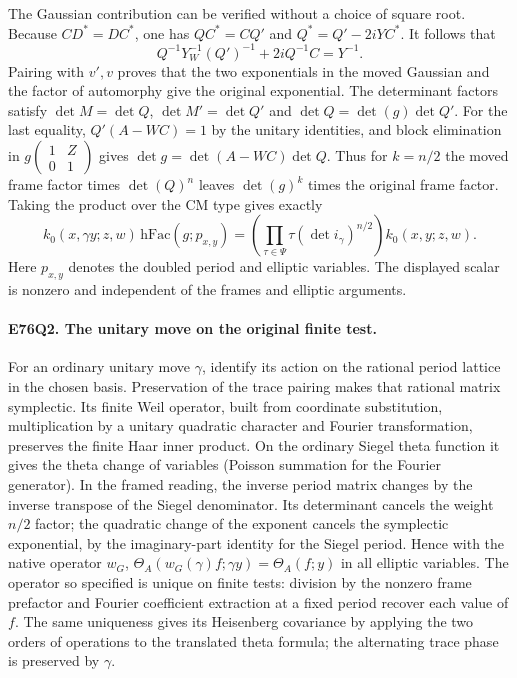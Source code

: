 The Gaussian contribution can be verified without a choice of
square root. Because $CD^*=DC^*$, one has $QC^*=CQ'$ and
$Q^*=Q'-2iYC^*$. It follows that
\[
 Q^{-1}Y_W^{-1}(Q')^{-1}+2iQ^{-1}C=Y^{-1}.
\]
Pairing with $v',v$ proves that the two exponentials in the moved
Gaussian and the factor of automorphy give the original exponential.
The determinant factors satisfy
$\det M=\det Q$, $\det M'=\det Q'$ and
$\det Q=\det(g)\det Q'$. For the last equality,
$Q'(A-WC)=1$ by the unitary identities, and block elimination in
$g\left(\begin{smallmatrix}1&Z\\0&1\end{smallmatrix}\right)$
gives $\det g=\det(A-WC)\det Q$. Thus for $k=n/2$ the moved frame
factor times $\det(Q)^n$ leaves $\det(g)^k$ times the original
frame factor. Taking the product over the CM type gives exactly
\[
 k_0(x,\gamma y;z,w)\,\mathrm{hFac}(g;p_{x,y})=
 \left(\prod_{\tau\in\Psi}\tau(\det i_\gamma)^{n/2}\right)
                 k_0(x,y;z,w).
\]
Here $p_{x,y}$ denotes the doubled period and elliptic variables.
The displayed scalar is nonzero and independent of the frames and
elliptic arguments.

\paragraph{E76Q2. The unitary move on the original finite test.}
For an ordinary unitary move $\gamma$, identify its action on the
rational period lattice in the chosen basis. Preservation of the
trace pairing makes that rational matrix symplectic. Its finite
Weil operator, built from coordinate substitution, multiplication
by a unitary quadratic character and Fourier transformation, preserves
the finite Haar inner product. On the ordinary Siegel theta function
it gives the theta change of variables (Poisson summation for the
Fourier generator). In the framed reading, the inverse period matrix
changes by the inverse transpose of the Siegel denominator. Its
determinant cancels the weight $n/2$ factor; the quadratic change
of the exponent cancels the symplectic exponential, by the
imaginary-part identity for the Siegel period. Hence with the
native operator $w_G$,
$\Theta_A(w_G(\gamma)f;\gamma y)=\Theta_A(f;y)$ in all elliptic
variables. The operator so specified is unique on finite tests:
division by the nonzero frame prefactor and Fourier coefficient
extraction at a fixed period recover each value of $f$. The same
uniqueness gives its Heisenberg covariance by applying the two
orders of operations to the translated theta formula; the alternating
trace phase is preserved by $\gamma$.

